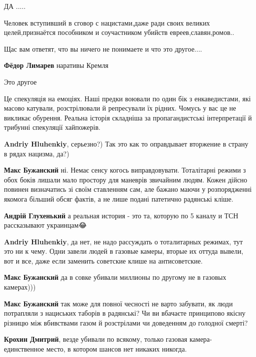 \begin{itemize}
ДА .....


Человек вступивший в сговор с нацистами,даже ради своих великих
целей,признаётся пособником и соучастником убийств евреев,славян,ромов..

Щас вам ответят, что вы ничего не понимаете и что это другое....

\textbf{Фёдор Лимарев} наративы Кремля

Это другое 🙈


Це спекуляція на емоціях. Наші предки воювали по один бік з енкаведистами, які
масово катували, розстрілювали й репресували їх рідних. Чомусь у вас це не
викликає обурення. Реальна історія складніша за пропагандистські інтерпретації
й трибунні спекуляції хайпожерів.

\begin{itemize}
\textbf{Andriy Hluhenkiy}, серьезно?) Так это как то оправдывает вторжение в страну в рядах нацизма, да?)

\textbf{Макс Бужанский} ні. Немає сенсу когось виправдовувати. Тоталітарні
режими з обох боків лишали мало простору для маневрів звичайним людям. Кожен
дійсно повинен визначатись зі своїм ставленням сам, але бажано маючи у
розпорядженні якомога більший обсяг фактів, а не лише подані патетично
радянські кліше.

\textbf{Андрій Глухенький} а реальная история - это та, которую по 5 каналу и ТСН рассказывают украинцам😂

\textbf{Andriy Hluhenkiy}, да нет, не надо рассуждать о тоталитарных режимах, тут это ни к чему.
Одни завели людей в газовые камеры, вторые их оттуда вывели, вот и все, даже если заменить советские клише на антисоветские.

\textbf{Макс Бужанский} да в совке убивали миллионы по другому не в газовых камерах)))

\textbf{Макс Бужанский} так може для повної чесності не варто забувати, як люди
потрапляли з нациських таборів в радянські? Чи ви вбачаєте принципово якісну
різницю між вбивствами газом й розстрілами чи доведенням до голодної смерті?

\textbf{Крохин Дмитрий}, везде убивали по всякому, только газовая камера- единственное место, в котором шансов нет никаких никогда.


\end{itemize}
\end{itemize}
